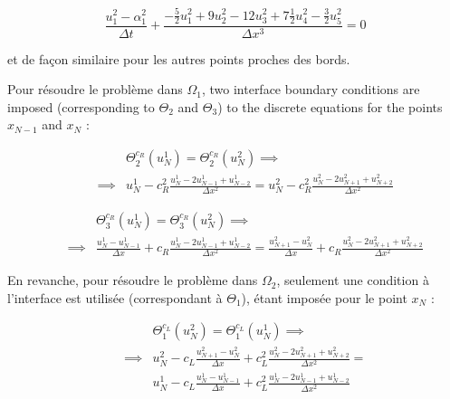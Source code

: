 \begin{equation}
    \label{eq:uncenteredFDdiscretization0}
    \frac{u_{1}^2 - \alpha_{1}^2}{\Delta t} + \frac{-\frac{5}{2}u_{1}^2 + 9u_{2}^2 - 12 u_{3}^2 + 7\frac{1}{2}u_{4}^2 -\frac{3}{2}u_{5}^2}{\Delta x ^3} = 0
\end{equation}

\noindent et de façon similaire pour les autres points proches des bords.

\indent Pour résoudre le problème dans $\Omega_1$, two interface boundary conditions are imposed (corresponding to $\Theta_2$ and $\Theta_3$) to the discrete equations for the points $x_{N-1}$ and $x_N$ : 

\begin{equation}
	\begin{aligned}
    \label{eq:TBCsIterOmega1A}
    && 				&\Theta_2^{c_R}(u_N^1) = \Theta_2^{c_R}(u_N^2) \implies \\ 
    && \implies & u_N^1 - c_R^2 \frac{u_N^1 - 2u_{N-1}^1 + u_{N-2}^1}{\Delta x^2} = u_N^2 - c_R^2 \frac{u_N^2 - 2u_{N+1}^2 + u_{N+2}^2}{\Delta x^2} 
    \end{aligned}
\end{equation}

\begin{equation}
	\begin{aligned}
    \label{eq:TBCsIterOmega1B}
    && 			   & \Theta_3^{c_R}(u_N^1) = \Theta_3^{c_R}(u_N^2) \implies \\
    && \implies & \frac{u_N^1 - u_{N-1}^1}{\Delta x} + c_R \frac{u_N^1 - 2u_{N-1}^1 + u_{N-2}^1}{\Delta x^2} = \frac{u_{N+1}^2 - u_{N}^2}{\Delta x} + c_R \frac{u_N^2 - 2u_{N+1}^2 + u_{N+2}^2}{\Delta x^2}
    \end{aligned}
\end{equation}

\indent En revanche, pour résoudre le problème dans $\Omega_2$, seulement une condition à l'interface est utilisée (correspondant à $\Theta_1$), étant imposée pour le point $x_N$ : 

\begin{equation}
	\begin{aligned}
    \label{eq:TBCsIterOmega2}
    && 				&\Theta_1^{c_L}(u_N^2) = \Theta_1^{c_L}(u_N^1) \implies \\ 
    && \implies & u_N^2 - c_L \frac{u_{N+1}^2 - u_{N}^2}{\Delta x} + c_L^2 \frac{u_N^2 - 2u_{N+1}^2 + u_{N+2}^2}{\Delta x^2}  =\\
    && 				& u_N^1 - c_L \frac{u_{N}^1 - u_{N-1}^1}{\Delta x} + c_L^2 \frac{u_N^1 - 2u_{N-1}^1 + u_{N-2}^1}{\Delta x^2}
    \end{aligned}
\end{equation}

